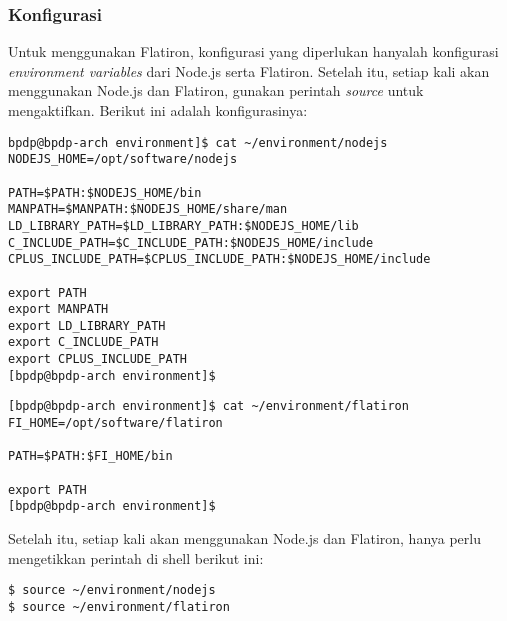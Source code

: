 \subsubsection{Konfigurasi}

Untuk menggunakan Flatiron, konfigurasi yang diperlukan hanyalah konfigurasi \textit{environment variables} dari Node.js serta Flatiron. Setelah itu, setiap kali akan menggunakan Node.js dan Flatiron, gunakan perintah \textit{source} untuk mengaktifkan. Berikut ini adalah konfigurasinya:

\lstset{language=bash,caption=Variabel lingkungan dari Node.js}
\begin{lstlisting}
bpdp@bpdp-arch environment]$ cat ~/environment/nodejs   
NODEJS_HOME=/opt/software/nodejs

PATH=$PATH:$NODEJS_HOME/bin
MANPATH=$MANPATH:$NODEJS_HOME/share/man
LD_LIBRARY_PATH=$LD_LIBRARY_PATH:$NODEJS_HOME/lib
C_INCLUDE_PATH=$C_INCLUDE_PATH:$NODEJS_HOME/include
CPLUS_INCLUDE_PATH=$CPLUS_INCLUDE_PATH:$NODEJS_HOME/include

export PATH
export MANPATH
export LD_LIBRARY_PATH
export C_INCLUDE_PATH
export CPLUS_INCLUDE_PATH
[bpdp@bpdp-arch environment]$ 
\end{lstlisting}

\lstset{language=bash,caption=Variabel lingkungan dari Flatiron}
\begin{lstlisting}
[bpdp@bpdp-arch environment]$ cat ~/environment/flatiron 
FI_HOME=/opt/software/flatiron

PATH=$PATH:$FI_HOME/bin

export PATH
[bpdp@bpdp-arch environment]$ 
\end{lstlisting}

Setelah itu, setiap kali akan menggunakan Node.js dan Flatiron, hanya perlu mengetikkan perintah di shell berikut ini:

\lstset{language=bash,caption=Mengaktifkan Node.js dan Flatiron}
\begin{lstlisting}
$ source ~/environment/nodejs
$ source ~/environment/flatiron
\end{lstlisting}

